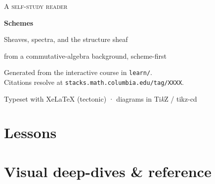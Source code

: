 \documentclass[11pt,oneside]{book}
\begin{document}
\begin{titlepage}
\centering
\vspace*{4cm}
{\scshape\large A self-study reader\par}
\vspace{1.2cm}
{\bfseries\Huge Schemes\par}
\vspace{0.6cm}
{\Large\color{accentB} Sheaves, spectra, and the structure sheaf\par}
\vspace{2.2cm}
{\large from a commutative-algebra background, scheme-first\par}
\vspace{1.4cm}
{\color{inksoft} Generated from the interactive course in \texttt{learn/}.\\[2pt]
Citations resolve at \texttt{stacks.math.columbia.edu/tag/XXXX}.\par}
\vfill
{\color{inksoft}\small Typeset with Xe\LaTeX{} (tectonic) · diagrams in Ti\textit{k}Z / tikz-cd\par}
\end{titlepage}

\tableofcontents
\cleardoublepage

\part{Lessons}





\part{Visual deep-dives \& reference}




\end{document}
